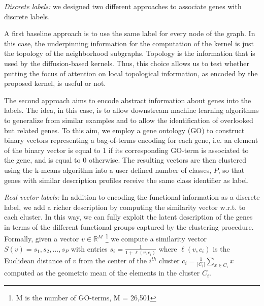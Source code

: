 \documentclass[review]{elsarticle}
\begin{document}
\textit{Discrete labels:} we designed two different approaches to associate genes with discrete labels.

A first baseline approach is to use the same label for every node of the graph. In this case, the underpinning information for the computation of the kernel is just the topology of the neighborhood subgraphs. Topology is the information that is used by the diffusion-based kernels. Thus, this choice allows us to test whether putting the focus of attention on local topological information, as encoded by the proposed kernel, is useful or not.

The second approach aims to encode abstract information about genes into the labels. The idea, in this case, is to allow  downstream machine learning algorithms to generalize from similar examples and to allow the identification of overlooked but related genes. To this aim, we employ a gene ontology (GO) \cite{gene2004gene} to construct binary vectors representing a bag-of-terms encoding for each gene, i.e. an element of the binary vector is equal to 1 if its corresponding GO-term is associated to the gene, and is equal to 0 otherwise. The resulting vectors are then clustered using the k-means algorithm into a user defined number of classes, $P$, so that genes with similar description profiles receive the same class identifier as label.

\textit{Real vector labels:} In addition to encoding the functional information as a discrete label, we add a richer description by computing the similarity vector w.r.t. to each cluster. In this way, we can fully exploit the latent description of the genes in terms of the different functional groups captured by the clustering procedure. Formally, given a vector $v \in \mathbb{R}^{M}$ \footnote{M is the number of GO-terms, M = 26,501} we compute a similarity vector $S(v)= {s_1, s_2, \ldots, s_P}$ with entries $s_i = \frac{1}{1+ \ell(v,c_i)}$ where $\ell(v,c_i)$ is the Euclidean distance of $v$ from the center of the $i^{th}$ cluster $c_i = \frac{1}{|C_i|}\sum_{x \in C_i} x$ computed as the geometric mean of the elements in the cluster $C_i$.
\end{document}
